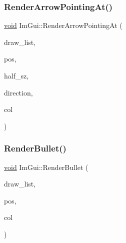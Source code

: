 \mbox{\label{namespaceImGui_af1ea568bffa58ec26100de3bf60af5f2}} 
\subsubsection{\texorpdfstring{Render\+Arrow\+Pointing\+At()}{RenderArrowPointingAt()}}
{\footnotesize\ttfamily \hyperlink{imgui__impl__opengl3__loader_8h_ac668e7cffd9e2e9cfee428b9b2f34fa7}{void} Im\+Gui\+::\+Render\+Arrow\+Pointing\+At (\begin{DoxyParamCaption}\item[{\hyperlink{structImDrawList}{Im\+Draw\+List} $\ast$}]{draw\+\_\+list,  }\item[{\hyperlink{structImVec2}{Im\+Vec2}}]{pos,  }\item[{\hyperlink{structImVec2}{Im\+Vec2}}]{half\+\_\+sz,  }\item[{Im\+Gui\+Dir}]{direction,  }\item[{Im\+U32}]{col }\end{DoxyParamCaption})}

\mbox{\label{namespaceImGui_a46189f75b2e25d595f1e71060d2a2633}} 
\subsubsection{\texorpdfstring{Render\+Bullet()}{RenderBullet()}}
{\footnotesize\ttfamily \hyperlink{imgui__impl__opengl3__loader_8h_ac668e7cffd9e2e9cfee428b9b2f34fa7}{void} Im\+Gui\+::\+Render\+Bullet (\begin{DoxyParamCaption}\item[{\hyperlink{structImDrawList}{Im\+Draw\+List} $\ast$}]{draw\+\_\+list,  }\item[{\hyperlink{structImVec2}{Im\+Vec2}}]{pos,  }\item[{Im\+U32}]{col }\end{DoxyParamCaption})}

\mbox{\label{namespaceImGui_a32d6e6c359b59df1e4f9517d65e443b8}} 
